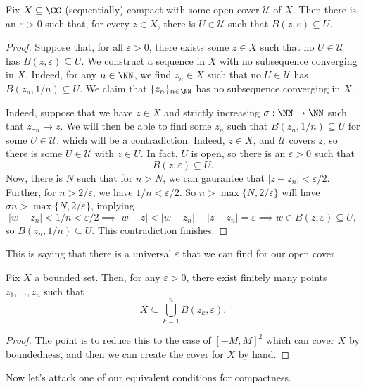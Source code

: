 \begin{lemma} \label{lem:singleepsilon}
	Fix $X\subseteq\CC$ (sequentially) compact with some open cover $\mathcal U$ of $X$. Then there is an $\varepsilon>0$ such that, for every $z\in X$, there is $U\in\mathcal U$ such that $B(z,\varepsilon)\subseteq U$.
\end{lemma}
\begin{proof}
	Suppose that, for all $\varepsilon>0$, there exists some $z\in X$ such that no $U\in\mathcal U$ has $B(z,\varepsilon)\subseteq U$. We construct a sequence in $X$ with no subsequence converging in $X$. Indeed, for any $n\in\NN$, we find $z_n\in X$ such that no $U\in\mathcal U$ has $B(z_n,1/n)\subseteq U$. We claim that $\{z_n\}_{n\in\NN}$ has no subsequence converging in $X$.

	Indeed, suppose that we have $z\in X$ and strictly increasing $\sigma:\NN\to\NN$ such that $z_{\sigma n}\to z$. We will then be able to find some $z_n$ such that $B(z_n,1/n)\subseteq U$ for some $U\in\mathcal U$, which will be a contradiction. Indeed, $z\in X$, and $\mathcal U$ covers $z$, so there is some $U\in\mathcal U$ with $z\in U$. In fact, $U$ is open, so there is an $\varepsilon>0$ such that
	\[B(z,\varepsilon)\subseteq U.\]
	Now, there is $N$ such that for $n>N$, we can gaurantee that $|z-z_n|<\varepsilon/2$. Further, for $n>2/\varepsilon$, we have $1/n<\varepsilon/2$. So $n>\max\{N,2/\varepsilon\}$ will have $\sigma n>\max\{N,2/\varepsilon\}$, implying
	\[|w-z_n|<1/n<\varepsilon/2\implies|w-z|<|w-z_n|+|z-z_n|=\varepsilon\implies w\in B(z,\varepsilon)\subseteq U,\]
	so $B(z_n,1/n)\subseteq U$. This contradiction finishes.
\end{proof}
This is saying that there is a universal $\varepsilon$ that we can find for our open cover.
\begin{lemma} \label{lem:easycover}
	Fix $X$ a bounded set. Then, for any $\varepsilon>0$, there exist finitely many points $z_1,\ldots,z_n$ such that
	\[X\subseteq\bigcup_{k=1}^nB(z_k,\varepsilon).\]
\end{lemma}
\begin{proof}
	The point is to reduce this to the case of $[-M,M]^2$ which can cover $X$ by boundedness, and then we can create the cover for $X$ by hand.
\end{proof}
Now let's attack one of our equivalent conditions for compactness.
\closedbounded*
